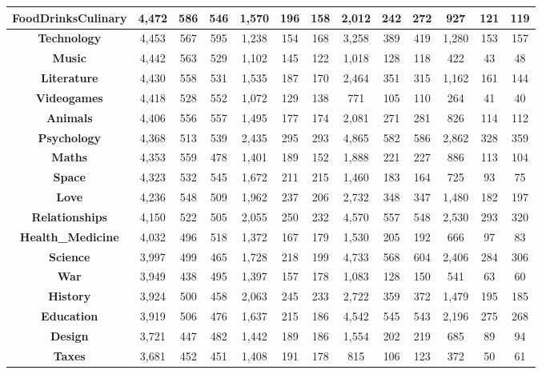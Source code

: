 \begin{table}[t]
{\begin{tabular}{|c||c|c|c||c|c|c||c|c|c||c|c|c|}
\textbf{FoodDrinksCulinary} & 4,472 & 586 & 546 & 1,570 & 196 & 158 & 2,012 & 242 & 272 & 927 & 121 & 119\\ \hline
\textbf{Technology} & 4,453 & 567 & 595 & 1,238 & 154 & 168 & 3,258 & 389 & 419 & 1,280 & 153 & 157\\ \hline
\textbf{Music} & 4,442 & 563 & 529 & 1,102 & 145 & 122 & 1,018 & 128 & 118 & 422 & 43 & 48\\ \hline
\textbf{Literature} & 4,430 & 558 & 531 & 1,535 & 187 & 170 & 2,464 & 351 & 315 & 1,162 & 161 & 144\\ \hline
\textbf{Videogames} & 4,418 & 528 & 552 & 1,072 & 129 & 138 & 771 & 105 & 110 & 264 & 41 & 40\\ \hline
\textbf{Animals} & 4,406 & 556 & 557 & 1,495 & 177 & 174 & 2,081 & 271 & 281 & 826 & 114 & 112\\ \hline
\textbf{Psychology} & 4,368 & 513 & 539 & 2,435 & 295 & 293 & 4,865 & 582 & 586 & 2,862 & 328 & 359\\ \hline
\textbf{Maths} & 4,353 & 559 & 478 & 1,401 & 189 & 152 & 1,888 & 221 & 227 & 886 & 113 & 104\\ \hline
\textbf{Space} & 4,323 & 532 & 545 & 1,672 & 211 & 215 & 1,460 & 183 & 164 & 725 & 93 & 75\\ \hline
\textbf{Love} & 4,236 & 548 & 509 & 1,962 & 237 & 206 & 2,732 & 348 & 347 & 1,480 & 182 & 197\\ \hline
\textbf{Relationships} & 4,150 & 522 & 505 & 2,055 & 250 & 232 & 4,570 & 557 & 548 & 2,530 & 293 & 320\\ \hline
\textbf{Health\_Medicine} & 4,032 & 496 & 518 & 1,372 & 167 & 179 & 1,530 & 205 & 192 & 666 & 97 & 83\\ \hline
\textbf{Science} & 3,997 & 499 & 465 & 1,728 & 218 & 199 & 4,733 & 568 & 604 & 2,406 & 284 & 306\\ \hline
\textbf{War} & 3,949 & 438 & 495 & 1,397 & 157 & 178 & 1,083 & 128 & 150 & 541 & 63 & 60\\ \hline
\textbf{History} & 3,924 & 500 & 458 & 2,063 & 245 & 233 & 2,722 & 359 & 372 & 1,479 & 195 & 185\\ \hline
\textbf{Education} & 3,919 & 506 & 476 & 1,637 & 215 & 186 & 4,542 & 545 & 543 & 2,196 & 275 & 268\\ \hline
\textbf{Design} & 3,721 & 447 & 482 & 1,442 & 189 & 186 & 1,554 & 202 & 219 & 685 & 89 & 94\\ \hline
\textbf{Taxes} & 3,681 & 452 & 451 & 1,408 & 191 & 178 & 815 & 106 & 123 & 372 & 50 & 61\\ \hline

\end{tabular}}
\end{table}
